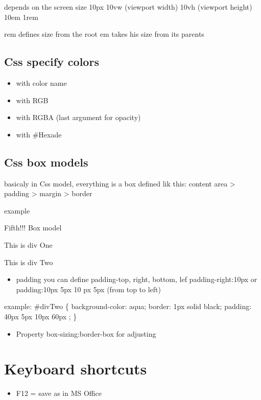 \documentclass[
]{book}
\providecommand{\tightlist}{%
  \setlength{\itemsep}{0pt}\setlength{\parskip}{0pt}}
\begin{document}
depends on the screen size
10px
10vw (viewport width)
10vh (viewport height)
10em
1rem

rem defines size from the root
em takes his size from its parents

\hypertarget{css-specify-colors}{%
\section{Css specify colors}\label{css-specify-colors}}

\begin{itemize}
\tightlist
\item
  with color name
\item
  with RGB
\item
  with RGBA (last argument for opacity)
\item
  with \#Hexade
\end{itemize}

\hypertarget{css-box-models}{%
\section{Css box models}\label{css-box-models}}

basicaly in Css model, everything is a box defined lik this:
content area \textgreater{} padding \textgreater{} margin \textgreater{} border

example

Fifth!!! Box model

\hypertarget{divOne}{}
This is div One

\hypertarget{divTwo}{}
This is div Two

\begin{itemize}
\tightlist
\item
  padding
  you can define padding-top, right, bottom, lef
  padding-right:10px
  or padding:10px 5px 10 px 5px (from top to left)
\end{itemize}

example:
\#divTwo \{
background-color: aqua;
border: 1px solid black;
padding: 40px 5px 10px 60px ;
\}

\begin{itemize}
\tightlist
\item
  Property box-sizing:border-box
  for adjusting
\end{itemize}

\hypertarget{keyboard-shortcuts}{%
\chapter{Keyboard shortcuts}\label{keyboard-shortcuts}}

\begin{itemize}
\tightlist
\item
  F12 = save as in MS Office
\end{itemize}

  
\end{document}
